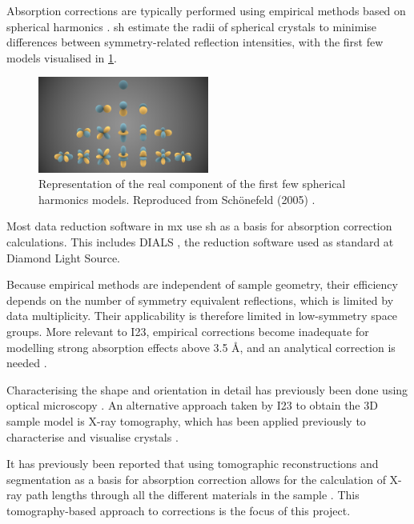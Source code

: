 Absorption corrections are typically performed using empirical methods based on spherical harmonics \cite{Blessing1995}. \ac{sh} estimate the radii of spherical crystals to minimise differences between symmetry-related reflection intensities, with the first few models visualised in \cref{fig:SH}. %


\begin{figure}
    \centering
    \includegraphics[trim={3cm 0 3cm 0},clip,width = 0.5\textwidth]{images/Spherical_Harmonics.png}
    \caption{Representation of the real component of the first few spherical harmonics models. Reproduced from Schönefeld (2005) \cite{Schoenefeld2005}.}
    \label{fig:SH}
\end{figure}

Most data reduction software in \ac{mx} use \ac{sh} as a basis for absorption correction calculations. This includes DIALS \cite{Winter2018}, the reduction software used as standard at Diamond Light Source.

Because empirical methods are independent of sample geometry, their efficiency depends on the number of symmetry equivalent reflections, which is limited by data multiplicity. Their applicability is therefore limited in low-symmetry space groups. More relevant to I23, empirical corrections become inadequate for modelling strong absorption effects above 3.5 Å, and an analytical correction is needed \cite{Kazantsev2021}.

Characterising the shape and orientation in detail has previously been done using optical microscopy \cite{Leal2008, Strutz2011}. %
An alternative approach taken by I23 to obtain the 3D sample model is X-ray tomography, which has been applied previously to characterise and visualise crystals \cite{Merrifield2011, Warren2013}.%

 It has previously been reported that using tomographic reconstructions and segmentation as a basis for absorption correction allows for the calculation of X-ray path lengths through all the different materials in the sample \cite{Brockhauser2008}. This tomography-based approach to corrections is the focus of this project.

